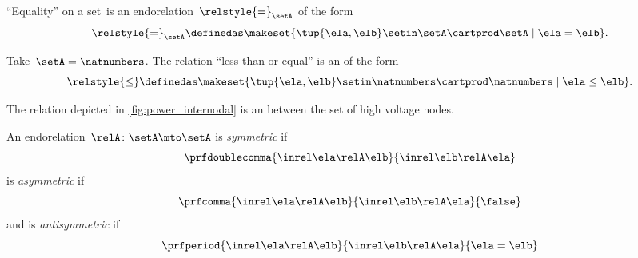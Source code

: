 \begin{example}
    ``Equality'' on a set~\setA is an endorelation~$\relstyle{=}_\setA$ of the form
    \begin{equation}
        \relstyle{=}_\setA \definedas \makeset{\tup{\ela,\elb}\setin \setA\cartprod \setA \mid \ela=\elb}.
    \end{equation}
\end{example}

\begin{example}
    Take~$\setA=\natnumbers$.
    The relation ``less than or equal'' is an  of the form
    \begin{equation}
        \relstyle{\leq} \definedas \makeset{\tup{\ela,\elb}\setin \natnumbers\cartprod \natnumbers\mid \ela \leq \elb}.
    \end{equation}
\end{example}

\begin{example}
    The relation depicted in \cref{fig:power_internodal} is an  between the set of high voltage nodes.
\end{example}

\begin{ctdefinition}
    \label{def:endo_sym_asym_antisym}
    \label{def:antisymmetry}
    \label{def:symmetric-relation}
    \label{def:asymmetric-relation}
    \label{def:antisymmetric-relation}
    An endorelation~$\relA\colon \setA\mto \setA$ is \emph{symmetric} if
    \begin{equation}\label{eq:symmetric}
        \prfdoublecomma{
            \inrel \ela \relA \elb
        }{
            \inrel \elb \relA \ela
        }
    \end{equation}
    is \emph{asymmetric} if
    \begin{equation}\label{eq:asymmetric}
        \prfcomma{
            \inrel \ela \relA \elb
        }{
            \inrel \elb \relA \ela
        }{
            \false
        }
    \end{equation}
    and is \emph{antisymmetric} if
    \begin{equation}\label{eq:antisymmetric}
        \prfperiod{
            \inrel \ela \relA \elb
        }{
            \inrel \elb \relA \ela
        }{
            \ela = \elb
        }
    \end{equation}
\end{ctdefinition}

